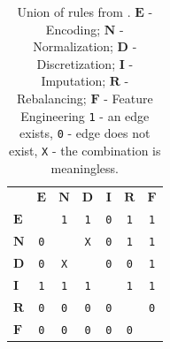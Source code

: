 \begin{example}
\begin{table}[b]
	\caption{
		Union of rules from . $\boldsymbol{E}$ - Encoding; $\boldsymbol{N}$ - Normalization; $\boldsymbol{D}$ - Discretization; $\boldsymbol{I}$ - Imputation; $\boldsymbol{R}$ - Rebalancing; $\boldsymbol{F}$ - Feature Engineering \texttt{1} - an edge exists, \texttt{0} - edge does not exist, \texttt{X} - the combination is meaningless.
	}
	\renewcommand{\arraystretch}{0.3}
	\footnotesize
	\centering
	\label{tbl:rules-union}
	\begin{threeparttable}
		\begin{tabular}{@{}lcccccc}
			\toprule
			& $\boldsymbol{E}$ & $\boldsymbol{N}$ & $\boldsymbol{D}$ & $\boldsymbol{I}$ & $\boldsymbol{R}$ & $\boldsymbol{F}$
			\\	\cmidrule[.1em]{1-7}
			$\boldsymbol{E}$ & \cellcolor{gray!25} & \texttt{1} & \texttt{1} & \texttt{0} & \texttt{1} & \texttt{1} \\	\cmidrule[.1em]{1-7}
			$\boldsymbol{N}$ & \texttt{0} & \cellcolor{gray!25}  & \texttt{X} & \texttt{0} & \texttt{1} & \texttt{1} \\	\cmidrule[.1em]{1-7}
			$\boldsymbol{D}$ & \texttt{0} & \texttt{X} & \cellcolor{gray!25} & \texttt{0} & \texttt{0} & \texttt{1} \\	\cmidrule[.1em]{1-7}
			$\boldsymbol{I}$ & \texttt{1} & \texttt{1} & \texttt{1} & \cellcolor{gray!25}  & \texttt{1} & \texttt{1} \\	\cmidrule[.1em]{1-7}
			$\boldsymbol{R}$ & \texttt{0} & \texttt{0} & \texttt{0} & \texttt{0} & \cellcolor{gray!25}  & \texttt{0} \\	\cmidrule[.1em]{1-7}
			$\boldsymbol{F}$ & \texttt{0} & \texttt{0} & \texttt{0} & \texttt{0} & \texttt{0} & \cellcolor{gray!25} \\	\cmidrule[.1em]{1-7}
		\end{tabular}
	\end{threeparttable}
\end{table}



\end{example}
